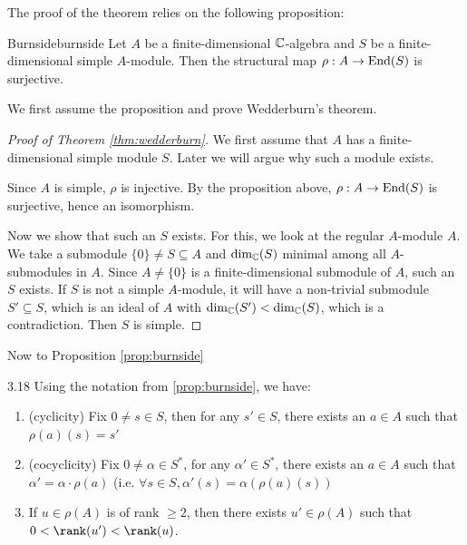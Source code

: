 \documentclass[twoside = false,	%
		headsepline,		%
		parskip = true,
		]{scrbook}						%
\begin{document}
    The proof of the theorem relies on the following proposition:

    \begin{proposition}{Burnside}{burnside}
        Let $A$ be a finite-dimensional $\mathbb C$-algebra and $S$ be a finite-dimensional simple $A$-module. Then the structural map $\rho: A \to \mathrm{End}(S)$ is surjective.
    \end{proposition}

    We first assume the proposition and prove Wedderburn's theorem.

    \begin{proof}[Proof of Theorem \ref{thm:wedderburn}]

        We first assume that $A$ has a finite-dimensional simple module $S$. Later we will argue why such a module exists.
        
        Since $A$ is simple, $\rho$ is injective. By the proposition above, $\rho: A \to \mathrm{End}(S)$ is surjective, hence an isomorphism.

        Now we show that such an $S$ exists. For this, we look at the regular $A$-module $A$. We take a submodule $\{0\} \neq S \subseteq A$ and $\dim_\mathbb C(S)$ minimal among all $A$-submodules in $A$. Since $A \neq \{0\}$ is a finite-dimensional submodule of $A$, such an $S$ exists. If $S$ is not a simple $A$-module, it will have a non-trivial submodule $S' \subseteq S$, which is an ideal of $A$ with $\dim_\mathbb C(S') < \dim_\mathbb C(S)$, which is a contradiction. Then $S$ is simple.
    \end{proof}

    Now to Proposition \ref{prop:burnside}

    \begin{lemma}{}{3.18}
        Using the notation from \ref{prop:burnside}, we have:
        \begin{enumerate}
            \item (cyclicity) Fix $0 \neq s \in S$, then for any $s' \in S$, there exists an $a \in A$ such that $\rho(a)(s) = s'$
            \item (cocyclicity) Fix $0 \neq \alpha \in S^*$, for any $\alpha' \in S^*$, there exists an $a \in A$ such that $\alpha' = \alpha \cdot \rho(a)$ (i.e. $\forall s \in S, \alpha'(s) = \alpha(\rho(a)(s))$
            \item If $u \in \rho(A)$ is of rank $\geq 2$, then there exists $u' \in \rho(A)$ such that $0 < \rank(u') < \rank(u)$.
        \end{enumerate}
    \end{lemma}
\end{document}

